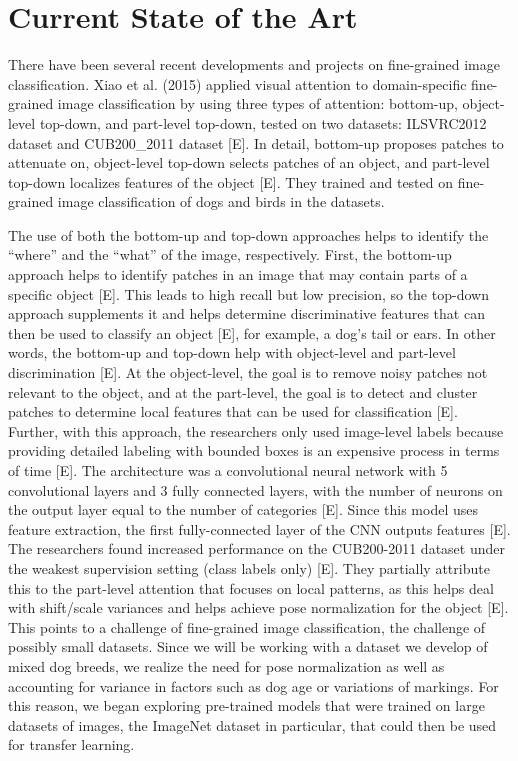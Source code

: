 \documentclass[12pt]{report}
\begin{document}
\section* {Current State of the Art} 
		
\indent	\par There have been several recent developments and projects on fine-grained image classification. Xiao et al. (2015) applied visual attention to domain-specific fine-grained image classification by using three types of attention: bottom-up, object-level top-down, and part-level top-down, tested on two datasets: ILSVRC2012 dataset and CUB200_2011 dataset [E]. In detail, bottom-up proposes patches to attenuate on, object-level top-down selects patches of an object, and part-level top-down localizes features of the object [E]. They trained and tested on fine-grained image classification of dogs and birds in the datasets.
\par The use of both the bottom-up and top-down approaches helps to identify the “where” and the “what” of the image, respectively. First, the bottom-up approach helps to identify patches in an image that may contain parts of a specific object [E]. This leads to high recall but low precision, so the top-down approach supplements it and helps determine discriminative features that can then be used to classify an object [E], for example, a dog’s tail or ears. In other words, the bottom-up and top-down help with object-level and part-level discrimination [E]. At the object-level, the goal is to remove noisy patches not relevant to the object, and at the part-level, the goal is to detect and cluster patches to determine local features that can be used for classification [E]. Further, with this approach, the researchers only used image-level labels because providing detailed labeling with bounded boxes is an expensive process in terms of time [E]. The architecture was a convolutional neural network with 5 convolutional layers and 3 fully connected layers, with the number of neurons on the output layer equal to the number of categories [E].  Since this model uses feature extraction, the first fully-connected layer of the CNN outputs features [E]. The researchers found increased performance on the CUB200-2011 dataset under the weakest supervision setting (class labels only) [E]. They partially attribute this to the part-level attention that focuses on local patterns, as this helps deal with shift/scale variances and helps achieve pose normalization for the object [E]. This points to a challenge of fine-grained image classification, the challenge of possibly small datasets. Since we will be working with a dataset we develop of mixed dog breeds, we realize the need for pose normalization as well as accounting for variance in factors such as dog age or variations of markings. For this reason, we began exploring pre-trained models that were trained on large datasets of images, the ImageNet dataset in particular, that could then be used for transfer learning.
\end{document}
